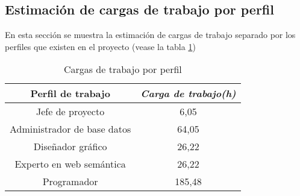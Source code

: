 \subsection{Estimación de cargas de trabajo por perfil}

En esta sección se muestra la estimación de cargas de trabajo separado por los perfiles que existen en el proyecto (vease la tabla \ref{tab:workload})

\begin{table}[htp]
	\centering
	\caption{Cargas de trabajo por perfil}\label{tab:workload}
	\begin{tabular}{cc}
		\toprule
    	\textbf{Perfil de trabajo} & \emph{Carga de trabajo(h)}\\
    	\midrule
		Jefe de proyecto & 6,05\\
		Administrador de base datos & 64,05\\
		Diseñador gráfico & 26,22\\
		Experto en web semántica & 26,22\\
		Programador & 185,48\\
    	\bottomrule
    \end{tabular}
\end{table}